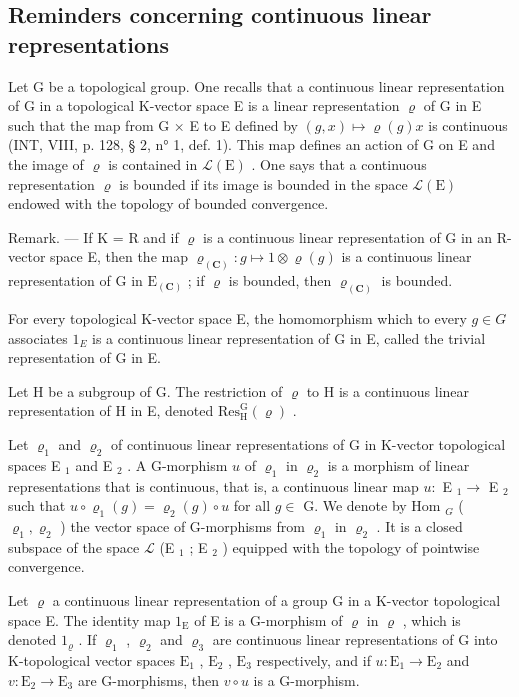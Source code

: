 \subsection{Reminders concerning continuous linear representations}

Let G be a topological group. One recalls that a continuous linear representation of G in a topological K-vector space E is a linear representation \(\varrho\) of G in E such that the map from G × E to E defined by \((g, x) \mapsto \varrho(g)x\) is continuous (INT, VIII, p. 128, § 2, n° 1, def. 1). This map defines an action of G on E and the image of \(\varrho\) is contained in \(\mathcal{L}(\mathrm{E})\) . One says that a continuous representation \(\varrho\) is bounded if its image is bounded in the space \(\mathcal{L}(\mathrm{E})\) endowed with the topology of bounded convergence.

Remark. --- If K = R and if \(\varrho\) is a continuous linear representation of G in an R-vector space E, then the map \(\varrho_{(\mathbf{C})}: g \mapsto 1 \otimes \varrho(g)\) is a continuous linear representation of G in \(\mathrm{E}_{(\mathbf{C})}\) ; if \(\varrho\) is bounded, then \(\varrho_{(\mathbf{C})}\) is bounded.

For every topological K-vector space E, the homomorphism which to every \(g \in G\) associates \(1_{E}\) is a continuous linear representation of G in E, called the trivial representation of G in E.

Let H be a subgroup of G. The restriction of \(\varrho\) to H is a continuous linear representation of H in E, denoted \(\mathrm{Res}_{\mathrm{H}}^{\mathrm{G}}(\varrho)\) .

Let \(\varrho_{1}\) and \(\varrho_{2}\) of continuous linear representations of G in K-vector topological spaces E \(_{1}\) and E \(_{2}\) . A G-morphism \(u\) of \(\varrho_{1}\) in \(\varrho_{2}\) is a morphism of linear representations that is continuous, that is, a continuous linear map \(u\colon\) E \(_{1} \to\) E \(_{2}\) such that \(u \circ \varrho_{1}(g) = \varrho_{2}(g) \circ u\) for all \(g \in\) G. We denote by Hom \(_{G}\) ( \(\varrho_{1}, \varrho_{2}\) ) the vector space of G-morphisms from \(\varrho_{1}\) in \(\varrho_{2}\) . It is a closed subspace of the space \(\mathcal{L}\) (E \(_{1}\) ; E \(_{2}\) ) equipped with the topology of pointwise convergence.

Let \(\varrho\) a continuous linear representation of a group G in a K-vector topological space E. The identity map \(1_{\mathrm{E}}\) of E is a G-morphism of \(\varrho\) in \(\varrho\) , which is denoted \(1_{\varrho}\) . If \(\varrho_1\) , \(\varrho_2\) and \(\varrho_3\) are continuous linear representations of G into K-topological vector spaces \(\mathrm{E}_1\) , \(\mathrm{E}_2\) , \(\mathrm{E}_3\) respectively, and if \(u: \mathrm{E}_1 \to \mathrm{E}_2\) and \(v: \mathrm{E}_2 \to \mathrm{E}_3\) are G-morphisms, then \(v \circ u\) is a G-morphism.

